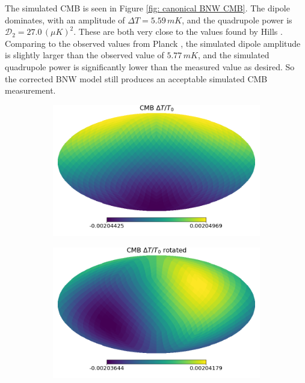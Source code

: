 \documentclass[a4paper,12pt]{report}
\begin{document}
The simulated CMB is seen in Figure \ref{fig: canonical BNW CMB}. The dipole dominates, with an amplitude of $\Delta T = 5.59\, \si{mK}$, and the quadrupole power is $\mathcal{D}_2 = 27.0\, (\mu \si{K})^2$. These are both very close to the values found by Hills \cite{RN42}. Comparing to the observed values from Planck \cite{RN32}, the simulated dipole amplitude is slightly larger than the observed value of $5.77\, \si{mK}$, and the simulated quadrupole power is significantly lower than the measured value as desired. So the corrected BNW model still produces an acceptable simulated CMB measurement.

\begin{figure}
    \centering
    \begin{subfigure}{0.45\textwidth}
        \centering
        \includegraphics[width=\textwidth]{canonical BNW recomputes/CMB.png}
        \caption{}
    \end{subfigure}
    \begin{subfigure}{0.45\textwidth}
        \centering
        \includegraphics[width=\textwidth]{canonical BNW recomputes/rotated CMB.png}

\end{subfigure}
\end{figure}
\end{document}
